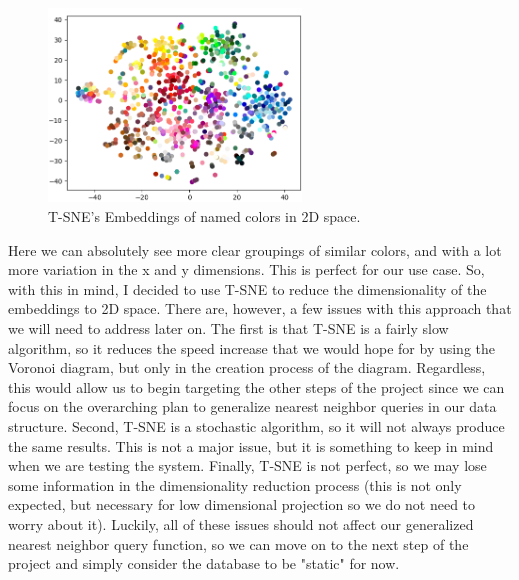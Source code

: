 \documentclass{article}
\begin{document}
\begin{figure}[H]
\centering
\includegraphics[width=0.6\textwidth]{images/tsne_2d_embeddings.png}
\caption{T-SNE's Embeddings of named colors in 2D space.}
\label{fig:tsne2dembeddings}
\end{figure}

\noindent
Here we can absolutely see more clear groupings of similar colors, and with a lot more variation
in the x and y dimensions. This is perfect for our use case. So, with this in mind, I decided to use
T-SNE to reduce the dimensionality of the embeddings to 2D space. There are, however, a few issues with this approach that we will need to address later on. The first
is that T-SNE is a fairly slow algorithm, so it reduces the speed increase that we would
hope for by using the Voronoi diagram, but only in the creation process of the diagram. Regardless, this would allow us to begin targeting
the other steps of the project since we can focus on the overarching plan to generalize
nearest neighbor queries in our data structure. Second, T-SNE is a stochastic algorithm, so
it will not always produce the same results. This is not a major issue, but it is something
to keep in mind when we are testing the system. Finally, T-SNE is not perfect, so we may
lose some information in the dimensionality reduction process (this is not only expected, but necessary for low dimensional projection so we do not need to worry about it). Luckily, all of these issues
should not affect our generalized nearest neighbor query function, so we can move on to the
next step of the project and simply consider the database to be "static" for now. 
\end{document}
